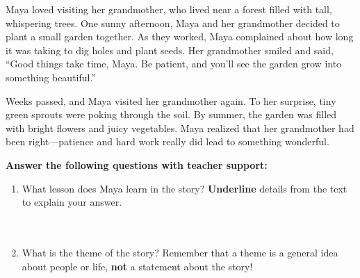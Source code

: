 \documentclass[12pt]{article}
\begin{document}
\begin{tcolorbox}[colframe=black!60, colback=white, 
coltitle=black, colbacktitle=black!15, fonttitle=\bfseries\Large, 
title=Maya's Garden, halign title=center, left=10pt, right=10pt, top=10pt, bottom=15pt]


Maya loved visiting her grandmother, who lived near a forest filled with tall, whispering trees. One sunny afternoon, Maya and her grandmother decided to plant a small garden together. As they worked, Maya complained about how long it was taking to dig holes and plant seeds. Her grandmother smiled and said, “Good things take time, Maya. Be patient, and you’ll see the garden grow into something beautiful.” 

Weeks passed, and Maya visited her grandmother again. To her surprise, tiny green sprouts were poking through the soil. By summer, the garden was filled with bright flowers and juicy vegetables. Maya realized that her grandmother had been right—patience and hard work really did lead to something wonderful.
\end{tcolorbox}

\vspace{1em}

\begin{tcolorbox}[colframe=black!60, colback=white, 
coltitle=black, colbacktitle=black!15, fonttitle=\bfseries\Large, 
title=Guided Practice, halign title=center, left=10pt, right=10pt, top=10pt, bottom=15pt]
\textbf{Answer the following questions with teacher support:}
\begin{enumerate}[itemsep=3em]
    \item What lesson does Maya learn in the story? \textbf{Underline} details from the text to explain your answer.
\\[0.8cm] \underline{\hspace{15cm}}  
    \\[0.8cm] \underline{\hspace{15cm}}  
    \\[0.8cm] \underline{\hspace{15cm}} 
    \item What is the theme of the story? Remember that a theme is a general idea about people or life, \textbf{not} a statement about the story!
\\[0.8cm] \underline{\hspace{15cm}}  
    \\[0.8cm] \underline{\hspace{15cm}}  
    \\[0.8cm] \underline{\hspace{15cm}} 

\end{enumerate}
\end{tcolorbox}
\end{document}
